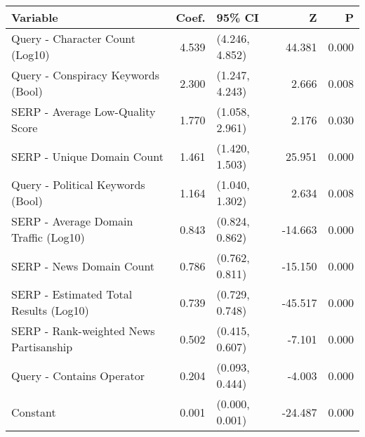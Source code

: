 \begin{tabular}{>{\raggedright\arraybackslash}p{8cm}rlrr}
\toprule
\textbf{Variable} & \textbf{Coef.} & \textbf{95\% CI} & \textbf{Z} & \textbf{P} \\
\midrule
Query - Character Count (Log10) & 4.539 & (4.246, 4.852) & 44.381 & 0.000 \\
Query - Conspiracy Keywords (Bool) & 2.300 & (1.247, 4.243) & 2.666 & 0.008 \\
SERP - Average Low-Quality Score & 1.770 & (1.058, 2.961) & 2.176 & 0.030 \\
SERP - Unique Domain Count & 1.461 & (1.420, 1.503) & 25.951 & 0.000 \\
Query - Political Keywords (Bool) & 1.164 & (1.040, 1.302) & 2.634 & 0.008 \\
SERP - Average Domain Traffic (Log10) & 0.843 & (0.824, 0.862) & -14.663 & 0.000 \\
SERP - News Domain Count & 0.786 & (0.762, 0.811) & -15.150 & 0.000 \\
SERP - Estimated Total Results (Log10) & 0.739 & (0.729, 0.748) & -45.517 & 0.000 \\
SERP - Rank-weighted News Partisanship & 0.502 & (0.415, 0.607) & -7.101 & 0.000 \\
Query - Contains Operator & 0.204 & (0.093, 0.444) & -4.003 & 0.000 \\
Constant & 0.001 & (0.000, 0.001) & -24.487 & 0.000 \\
\bottomrule
\end{tabular}
